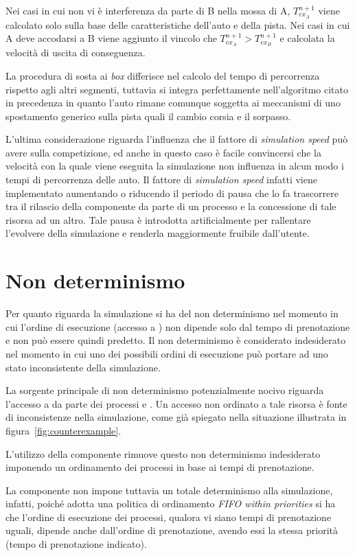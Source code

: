 Nei casi in cui non vi è interferenza da parte di B nella mossa di A, $T_{ex_A}^{n+1}$ viene calcolato solo sulla base delle caratteristiche dell'auto e della pista.
Nei casi in cui A deve accodarsi a B viene aggiunto il vincolo che $T_{ex_A}^{n+1} > T_{ex_B}^{n+1}$ e calcolata la velocità di uscita di conseguenza.

La procedura di sosta ai \textit{box} differisce nel calcolo del tempo di percorrenza rispetto agli altri segmenti, tuttavia si integra perfettamente nell'algoritmo citato in precedenza in quanto l'auto rimane comunque soggetta ai meccanismi di uno spostamento generico sulla pista quali il cambio corsia e il sorpasso.

L'ultima considerazione riguarda l'influenza che il fattore di \textit{simulation speed} può avere sulla competizione, ed anche in questo caso è facile convincersi che la velocità con la quale viene eseguita la simulazione non influenza in alcun modo i tempi di percorrenza delle auto. Il fattore di \textit{simulation speed} infatti viene implementato aumentando o riducendo il periodo di pausa che lo \sched{} fa trascorrere tra il rilascio della componente \track{} da parte di un processo e la concessione di tale risorsa ad un altro. Tale pausa è introdotta artificialmente per rallentare l'evolvere della simulazione e renderla maggiormente fruibile dall'utente.

\section{Non determinismo}
Per quanto riguarda la simulazione si ha del non determinismo nel momento in cui l'ordine di esecuzione (accesso a \track{}) non dipende solo dal tempo di prenotazione e non può essere quindi predetto.
Il non determinismo è considerato indesiderato nel momento in cui uno dei possibili ordini di esecuzione può portare ad uno stato inconsistente della simulazione.

La sorgente principale di non determinismo potenzialmente nocivo riguarda l'accesso a \track{} da parte dei processi \car{} e \weather{}. Un accesso non ordinato a tale risorsa è fonte di inconsistenze nella simulazione, come già spiegato nella situazione illustrata in figura~\ref{fig:counterexample}.

L'utilizzo della componente \sched{} rimuove questo non determinismo indesiderato imponendo un ordinamento dei processi in base ai tempi di prenotazione.

La componente \sched{} non impone tuttavia un totale determinismo alla simulazione, infatti, poiché adotta una politica di ordinamento \textit{FIFO within priorities} si ha che l'ordine di esecuzione dei processi, qualora vi siano tempi di prenotazione uguali, dipende anche dall'ordine di prenotazione, avendo essi la stessa priorità (tempo di prenotazione indicato).

